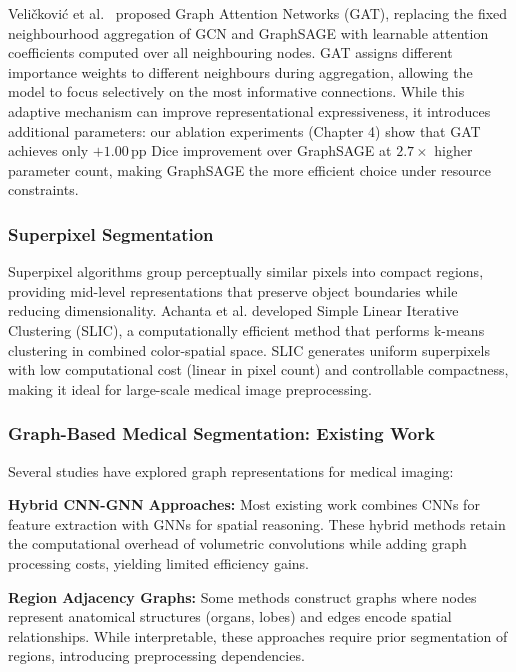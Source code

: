 \documentclass{article}
\begin{document}
Veličković et al.\ \cite{velickovic2018gat} proposed Graph Attention Networks (GAT), replacing the fixed neighbourhood aggregation of GCN and GraphSAGE with learnable attention coefficients computed over all neighbouring nodes. GAT assigns different importance weights to different neighbours during aggregation, allowing the model to focus selectively on the most informative connections. While this adaptive mechanism can improve representational expressiveness, it introduces additional parameters: our ablation experiments (Chapter 4) show that GAT achieves only $+1.00$\,pp Dice improvement over GraphSAGE at $2.7\times$ higher parameter count, making GraphSAGE the more efficient choice under resource constraints.

\subsubsection{Superpixel Segmentation}

Superpixel algorithms group perceptually similar pixels into compact regions, providing mid-level representations that preserve object boundaries while reducing dimensionality. Achanta et al. \cite{achanta2012slic} developed Simple Linear Iterative Clustering (SLIC), a computationally efficient method that performs k-means clustering in combined color-spatial space. SLIC generates uniform superpixels with low computational cost (linear in pixel count) and controllable compactness, making it ideal for large-scale medical image preprocessing.

\subsubsection{Graph-Based Medical Segmentation: Existing Work}

Several studies have explored graph representations for medical imaging:

\textbf{Hybrid CNN-GNN Approaches:} Most existing work combines CNNs for feature extraction with GNNs for spatial reasoning. These hybrid methods retain the computational overhead of volumetric convolutions while adding graph processing costs, yielding limited efficiency gains.

\textbf{Region Adjacency Graphs:} Some methods construct graphs where nodes represent anatomical structures (organs, lobes) and edges encode spatial relationships. While interpretable, these approaches require prior segmentation of regions, introducing preprocessing dependencies.
\end{document}
